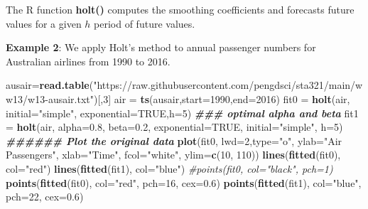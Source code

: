 \documentclass[
]{book}
\newenvironment{Shaded}{\begin{snugshade}}{\end{snugshade}}
\newcommand{\AttributeTok}[1]{\textcolor[rgb]{0.13,0.29,0.53}{#1}}
\newcommand{\CommentTok}[1]{\textcolor[rgb]{0.56,0.35,0.01}{\textit{#1}}}
\newcommand{\ConstantTok}[1]{\textcolor[rgb]{0.56,0.35,0.01}{#1}}
\newcommand{\DecValTok}[1]{\textcolor[rgb]{0.00,0.00,0.81}{#1}}
\newcommand{\DocumentationTok}[1]{\textcolor[rgb]{0.56,0.35,0.01}{\textbf{\textit{#1}}}}
\newcommand{\FloatTok}[1]{\textcolor[rgb]{0.00,0.00,0.81}{#1}}
\newcommand{\FunctionTok}[1]{\textcolor[rgb]{0.13,0.29,0.53}{\textbf{#1}}}
\newcommand{\NormalTok}[1]{#1}
\newcommand{\OtherTok}[1]{\textcolor[rgb]{0.56,0.35,0.01}{#1}}
\newcommand{\StringTok}[1]{\textcolor[rgb]{0.31,0.60,0.02}{#1}}
\begin{document}
The R function \textbf{holt()} computes the smoothing coefficients and forecasts future values for a given \(h\) period of future values.

\textbf{Example 2}: We apply Holt's method to annual passenger numbers for Australian airlines from 1990 to 2016.

\begin{Shaded}
\begin{Highlighting}[]
\NormalTok{ausair}\OtherTok{=}\FunctionTok{read.table}\NormalTok{(}\StringTok{"https://raw.githubusercontent.com/pengdsci/sta321/main/ww13/w13{-}ausair.txt"}\NormalTok{)[,}\DecValTok{3}\NormalTok{]}
\NormalTok{air }\OtherTok{=} \FunctionTok{ts}\NormalTok{(ausair,}\AttributeTok{start=}\DecValTok{1990}\NormalTok{,}\AttributeTok{end=}\DecValTok{2016}\NormalTok{)}
\NormalTok{fit0 }\OtherTok{=} \FunctionTok{holt}\NormalTok{(air, }\AttributeTok{initial=}\StringTok{"simple"}\NormalTok{, }\AttributeTok{exponential=}\ConstantTok{TRUE}\NormalTok{,}\AttributeTok{h=}\DecValTok{5}\NormalTok{)  }\DocumentationTok{\#\#\# optimal alpha and beta}
\NormalTok{fit1 }\OtherTok{=} \FunctionTok{holt}\NormalTok{(air, }\AttributeTok{alpha=}\FloatTok{0.8}\NormalTok{, }\AttributeTok{beta=}\FloatTok{0.2}\NormalTok{, }\AttributeTok{exponential=}\ConstantTok{TRUE}\NormalTok{, }\AttributeTok{initial=}\StringTok{"simple"}\NormalTok{, }\AttributeTok{h=}\DecValTok{5}\NormalTok{)}
\DocumentationTok{\#\#\#\#\#\# Plot the original data}
\FunctionTok{plot}\NormalTok{(fit0, }\AttributeTok{lwd=}\DecValTok{2}\NormalTok{,}\AttributeTok{type=}\StringTok{"o"}\NormalTok{, }\AttributeTok{ylab=}\StringTok{"Air Passengers"}\NormalTok{, }\AttributeTok{xlab=}\StringTok{"Time"}\NormalTok{,}
     \AttributeTok{fcol=}\StringTok{"white"}\NormalTok{, }\AttributeTok{ylim=}\FunctionTok{c}\NormalTok{(}\DecValTok{10}\NormalTok{, }\DecValTok{110}\NormalTok{))}
\FunctionTok{lines}\NormalTok{(}\FunctionTok{fitted}\NormalTok{(fit0), }\AttributeTok{col=}\StringTok{"red"}\NormalTok{)}
\FunctionTok{lines}\NormalTok{(}\FunctionTok{fitted}\NormalTok{(fit1), }\AttributeTok{col=}\StringTok{"blue"}\NormalTok{)}
\CommentTok{\#points(fit0, col="black", pch=1)}
\FunctionTok{points}\NormalTok{(}\FunctionTok{fitted}\NormalTok{(fit0), }\AttributeTok{col=}\StringTok{"red"}\NormalTok{, }\AttributeTok{pch=}\DecValTok{16}\NormalTok{, }\AttributeTok{cex=}\FloatTok{0.6}\NormalTok{)}
\FunctionTok{points}\NormalTok{(}\FunctionTok{fitted}\NormalTok{(fit1), }\AttributeTok{col=}\StringTok{"blue"}\NormalTok{, }\AttributeTok{pch=}\DecValTok{22}\NormalTok{, }\AttributeTok{cex=}\FloatTok{0.6}\NormalTok{)}

\end{Highlighting}
\end{Shaded}
\end{document}

